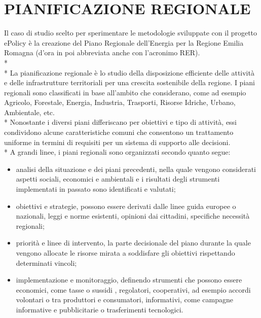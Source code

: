 \documentclass[12pt,a4paper,openright,twoside]{report}
\begin{document}
\section{PIANIFICAZIONE REGIONALE}

Il caso di studio scelto per sperimentare le metodologie sviluppate con il progetto ePolicy è la creazione del Piano Regionale dell'Energia per la Regione Emilia Romagna (d'ora in poi abbreviata anche con l'acronimo RER).\\*\\*
La pianificazione regionale è lo studio della disposizione efficiente delle attività e delle infrastrutture territoriali per una crescita sostenibile della regione. I piani regionali sono classificati in base all'ambito che considerano, come ad esempio Agricolo, Forestale, Energia, Industria, Trasporti, Risorse Idriche, Urbano, Ambientale, etc.\\*
Nonostante i diversi piani differiscano per obiettivi e tipo di attività, essi condividono alcune caratteristiche comuni che consentono un trattamento uniforme in termini di requisiti per un sistema di supporto alle decisioni.\\*
A grandi linee, i piani regionali sono organizzati secondo quanto segue: \begin{itemize}
\item analisi della situazione e dei piani precedenti, nella quale vengono considerati aspetti sociali, economici e ambientali e i risultati degli strumenti implementati in passato sono identificati e valutati;
\item obiettivi e strategie, possono essere derivati dalle linee guida europee o nazionali, leggi e norme esistenti, opinioni dai cittadini, specifiche necessità regionali;
\item priorità e linee di intervento, la parte decisionale del piano durante la quale vengono allocate le risorse mirata a soddisfare gli obiettivi rispettando determinati vincoli;
\item implementazione e monitoraggio, definendo strumenti che possono essere economici, come tasse o sussidi , regolatori, cooperativi, ad esempio accordi volontari o tra produttori e consumatori, informativi, come campagne informative e pubblicitarie o trasferimenti tecnologici.   
\end{itemize}
\end{document}
